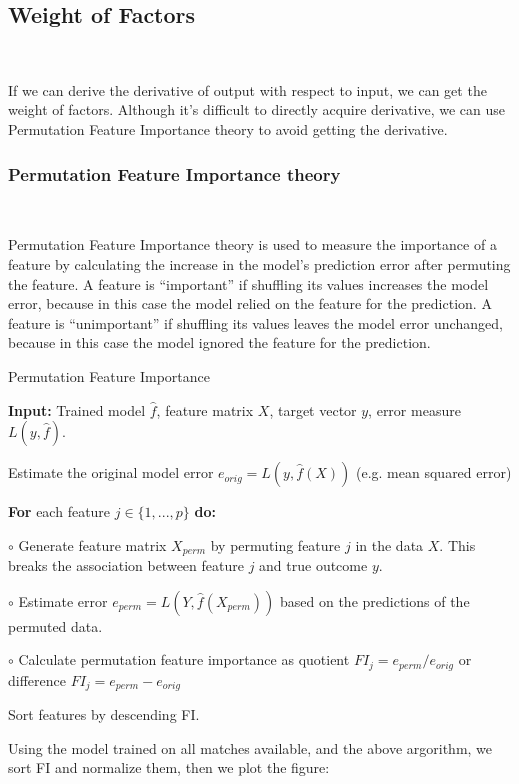 \subsection{Weight of Factors}~{}

If we can derive the derivative of output with respect to input, we can get the weight of factors.
Although it's difficult to directly acquire derivative, we can use Permutation Feature Importance theory
to avoid getting the derivative.

\subsubsection{Permutation Feature Importance theory}~{}

Permutation Feature Importance theory is used to measure the importance of a feature by calculating 
the increase in the model's prediction error after permuting the feature. A feature is “important” if shuffling its values increases the model error, 
because in this case the model relied on the feature for the prediction. A feature is “unimportant” if 
shuffling its values leaves the model error unchanged, because in this case the model ignored the feature 
for the prediction. 

\begin{algorithm}[H]
    \caption{Permutation Feature Importance}  
    \textbf{Input:} Trained model $\hat{f}$, feature matrix $X$, target vector $y$, error measure $L(y, \hat{f})$.  
      
    Estimate the original model error $e_{orig} = L(y, \hat{f}(X))$ (e.g. mean squared error)  
      
    \textbf{For} each feature $j \in \{1, ..., p\}$ \textbf{do:}  
      
    \quad\quad $\circ$ Generate feature matrix $X_{perm}$ by permuting feature $j$ in the data $X$. This breaks the association between feature $j$ and true outcome $y$.  
      
    \quad\quad $\circ$ Estimate error $e_{perm} = L(Y, \hat{f}(X_{perm}))$ based on the predictions of the permuted data.  
      
    \quad\quad $\circ$ Calculate permutation feature importance as quotient $FI_j = e_{perm} / e_{orig}$ or difference $FI_j = e_{perm} - e_{orig}$  
      
    Sort features by descending FI.
\end{algorithm}

Using the model trained on all matches available, and the above argorithm,
we sort FI and normalize them, then we plot the figure:

